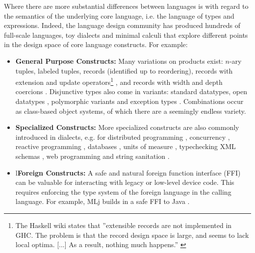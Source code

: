 \documentclass[preprint]{sigplanconf}
\begin{document}
Where there are more substantial differences between languages is with regard to the semantics of the underlying core language, i.e. the language of types and expressions. Indeed, the language design community has produced hundreds of full-scale languages, toy dialects and minimal calculi that explore different points in the design space of core language constructs. For example:
\begin{itemize}
\setlength{\itemsep}{-1pt}
\item 
\textbf{General Purpose Constructs:} 
Many variations on products exist: 
$n$-ary tuples, 
labeled tuples, 
records (identified up to reordering), records with extension and update operators\footnote{The Haskell wiki states that ''extensible records are not implemented in GHC. The problem is that the record design space is large, and seems to lack local optima. [...] As a result, nothing much happens.'' \cite{GHCFAQ}} \cite{ocaml-manual}, and 
records with width and depth coercions \cite{Cardelli:1984:SMI:1096.1098}%
. 
Disjunctive types also come in variants: standard datatypes, 
open datatypes \cite{conf/ppdp/LohH06,journals/toplas/MillsteinBC04}, 
polymorphic variants \cite{ocaml-manual} and 
exception types \cite{Tofte:89:TheDefinitionOfStandardML}. Combinations occur as class-based object systems, of which there are a seemingly endless variety. 

\item
\textbf{Specialized Constructs:} More specialized constructs are also commonly introduced in dialects, e.g. for distributed programming \cite{Murphy:2007:TDP:1793574.1793585}, concurrency \cite{AliceLookingGlass}, reactive programming \cite{mandel2005reactiveml}, databases \cite{Ohori:2011:MSM:2034773.2034815},  units of measure \cite{conf/cefp/Kennedy09}, typechecking XML schemas \cite{HosoyaVouillonPierce2000ICFP}, web programming \cite{conf/popl/Chlipala15} and string sanitation \cite{sanitation-psp14}.%

\item
l\textbf{Foreign Constructs:} A safe and natural foreign function interface (FFI) can be valuable for interacting with legacy or low-level device code. This requires enforcing the type system of the foreign language in the calling language. %
For example, MLj builds in a safe FFI to Java \cite{Benton:1999:IWW:317636.317791}.
\end{itemize}
\vspace{-3px}
\end{document}
